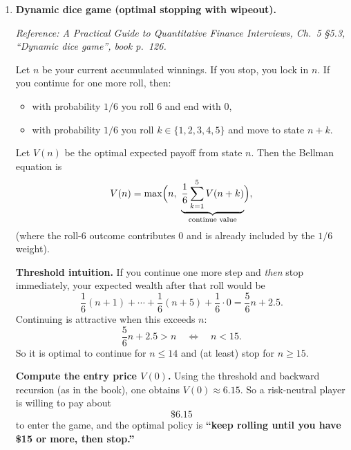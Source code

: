 \documentclass[11pt]{article}
\begin{document}
\begin{enumerate}[leftmargin=*, itemsep=1.0em]
\medskip
\textbf{Replicating bet.}
Suppose you bet $y(i,j)$ dollars on Team A in the next game with even odds. If A wins, wealth increases by $+y$; if A loses, wealth decreases by $y$.
To replicate the continuation values we need
\[
f(i,j)+y(i,j)=f(i+1,j),\qquad f(i,j)-y(i,j)=f(i,j+1).
\]
Solving gives
\[
y(i,j)=\frac{f(i+1,j)-f(i,j+1)}{2}.
\]

\medskip
\textbf{Compute $y(2,1)$.}
We compute $f(3,1)$ and $f(2,2)$ first (working backward from the boundary).
One finds:
\[
f(3,1)=75,\qquad f(2,2)=0.
\]
Hence
\[
y(2,1)=\frac{75-0}{2}=37.5.
\]
Interpretation: when the score is $(2,1)$, bet $\boxed{\$37.50}$ on Team A next game.

\item \textbf{Dynamic dice game (optimal stopping with wipeout).}

\textit{Reference: A Practical Guide to Quantitative Finance Interviews, Ch.\ 5 \S5.3, ``Dynamic dice game'', book p.\ 126.}

\medskip
Let $n$ be your current accumulated winnings. If you stop, you lock in $n$.
If you continue for one more roll, then:
\begin{itemize}
\item with probability $1/6$ you roll 6 and end with $0$,
\item with probability $1/6$ you roll $k\in\{1,2,3,4,5\}$ and move to state $n+k$.
\end{itemize}

Let $V(n)$ be the optimal expected payoff from state $n$. Then the Bellman equation is
\[
V(n)=\max\Bigl(n,\ \underbrace{\frac{1}{6}\sum_{k=1}^5 V(n+k)}_{\text{continue value}}\Bigr),
\]
(where the roll-6 outcome contributes $0$ and is already included by the $1/6$ weight).

\medskip
\textbf{Threshold intuition.}
If you continue one more step and \emph{then} stop immediately, your expected wealth after that roll would be
\[
\frac16(n+1)+\cdots+\frac16(n+5)+\frac16\cdot 0
=\frac56 n + 2.5.
\]
Continuing is attractive when this exceeds $n$:
\[
\frac56 n + 2.5 > n\quad\Longleftrightarrow\quad n<15.
\]
So it is optimal to continue for $n\le 14$ and (at least) stop for $n\ge 15$.

\medskip
\textbf{Compute the entry price $V(0)$.}
Using the threshold and backward recursion (as in the book), one obtains $V(0)\approx 6.15$.
So a risk-neutral player is willing to pay about
\[
\boxed{\$6.15}
\]
to enter the game, and the optimal policy is \textbf{``keep rolling until you have \$15 or more, then stop.''}


\end{enumerate}
\end{document}
